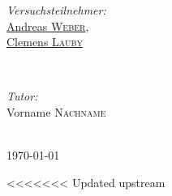 \documentclass[11pt,a4paper]{article}
\begin{document}
\begin{titlepage}
 
\mbox{}
\vfill
\begin{minipage}{0.4\textwidth}
\begin{flushleft} \large
\emph{Versuchsteilnehmer:}\\
\underline{Andreas \textsc{Weber}},\\ \underline{Clemens \textsc{Lauby}} %
\end{flushleft}
\end{minipage}
~
\begin{minipage}{0.4\textwidth}
\begin{flushright} \large
\emph{Tutor: } \\
Vorname \textsc{Nachname} %
\end{flushright}
\end{minipage}\\[1cm]



{\large \today}\\ %


 

\vfill %
\end{titlepage}
\newpage
{}

\tableofcontents
\newpage
{}
<<<<<<< Updated upstream
\end{document}
